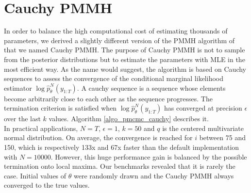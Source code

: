 \documentclass[11pt,a4,twosided,singlespacing,titlepagenumber=on]{scrreprt}
\numberwithin{equation}{chapter} %
\theoremstyle{remark}
\begin{document}

\section{Cauchy PMMH}
\label{app:cauchy_pmmh}
In order to balance the high computational cost of estimating thousands of parameters, we derived a slightly different version of the PMMH algorithm of \cite{andrieu2010} that we named Cauchy PMMH. The purpose of Cauchy PMMH is not to sample from the posterior distributions but to estimate the parameters with MLE in the most efficient way. As the name would suggest, the algorithm is based on Cauchy sequences to assess the convergence of the conditional marginal likelihood estimator $\log \hat{p}^N_{\theta}(y_{1:T})$. A cauchy sequence is a sequence whose elements become arbitrarily close to each other as the sequence progresses. The termination criterion is satisfied when $\log \hat{p}^N_{\theta}(y_{1:T})$ has converged at precision $\epsilon$ over the last $k$ values. Algorithm \ref{algo_pmcmc_cauchy} describes it. \\

In practical applications, $N = T$, $\epsilon = 1$, $k = 50$ and $q$ is the centered multivariate normal distribution. On average, the convergence is reached for $i$ between 75 and 150, which is respectively 133x and 67x faster than the default implementation with $N = 10000$. However, this huge performance gain is balanced by the possible termination onto local maxima. Our benchmarks revealed that it is rarely the case. Initial values of $\theta$ were randomly drawn and the Cauchy PMMH always converged to the true values.
\end{document}
